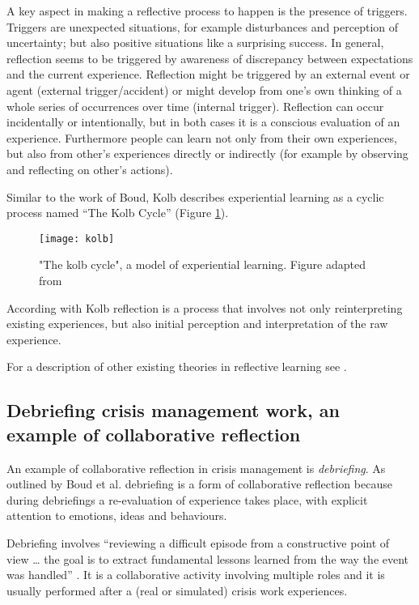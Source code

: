 A key aspect in making a reflective process to happen is the presence of triggers. Triggers are unexpected situations, for example disturbances and perception of uncertainty; but also positive situations like a surprising success. In general, reflection seems to be triggered by awareness of discrepancy between expectations and the current experience. Reflection might be triggered by an external event or agent (external trigger/accident) or might develop from one's own thinking of a whole series of occurrences over time (internal trigger). Reflection can occur incidentally or intentionally, but in both cases it is a conscious evaluation of an experience. Furthermore people can learn not only from their own experiences, but also from other's experiences directly or indirectly (for example by observing and reflecting on other's actions).

Similar to the work of Boud, Kolb describes experiential learning as a cyclic process named ``The Kolb Cycle'' (Figure \ref{fig:kolb-model}).

\begin{figure}
	[tbh] \centering 
	\texttt{[image: kolb]} \caption{"The kolb cycle", a model of experiential learning. Figure adapted from \protect\autocite{kolb1984organizational}} \label{fig:kolb-model} 
\end{figure}

According with Kolb \autocite*{kolb1984experiential} reflection is a process that involves not only reinterpreting existing experiences, but also initial perception and interpretation of the raw experience.

For a description of other existing theories in reflective learning see \autocite{WoodDaudelin199636}.

\subsection{Debriefing crisis management work, an example of collaborative reflection}\label{debriefing-crisis-management-work-an-example-of-collaborative-reflection}

An example of collaborative reflection in crisis management is \emph{debriefing}. As outlined by Boud et al. \autocite*{boud1985reflection} debriefing is a form of collaborative reflection because during debriefings a re-evaluation of experience takes place, with explicit attention to emotions, ideas and behaviours.

Debriefing involves ``reviewing a difficult episode from a constructive point of view \ldots{} the goal is to extract fundamental lessons learned from the way the event was handled'' \autocite{Lagadec:1997js}. It is a collaborative activity involving multiple roles and it is usually performed after a (real or simulated) crisis work experiences. 

